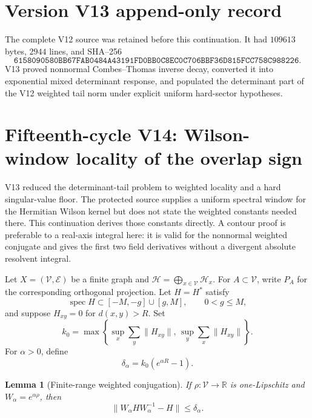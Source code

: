\documentclass[11pt]{article}
\newtheorem{lemma}[theorem]{Lemma}
\theoremstyle{remark}
\begin{document}
\section*{Version V13 append-only record}
The complete V12 source was retained before this continuation.  It
had \(109613\) bytes, \(2944\) lines, and SHA--256
\[
 \texttt{6158090580BB67FAB0484A43191FD0BB0C8EC0C706BBF36D815FCC758C988226}.
\]
V13 proved nonnormal Combes--Thomas inverse decay, converted it
into exponential mixed determinant response, and populated the
determinant part of the V12 weighted tail norm under explicit
uniform hard-sector hypotheses.

\section{Fifteenth-cycle V14: Wilson-window locality of the overlap sign}
\label{sec:v15v14}

V13 reduced the determinant-tail problem to weighted locality and a
hard singular-value floor.  The protected source supplies a uniform
spectral window for the Hermitian Wilson kernel but does not state the
weighted constants needed there.  This continuation derives those
constants directly.  A contour proof is preferable to a real-axis
integral here: it is valid for the nonnormal weighted conjugate and
gives the first two field derivatives without a divergent absolute
resolvent integral.

Let \(X=(\mathcal V,\mathcal E)\) be a finite graph and
\(\mathcal H=\bigoplus_{x\in\mathcal V}\mathcal H_x\).  For
\(A\subset\mathcal V\), write \(P_A\) for the corresponding
orthogonal projection.  Let \(H=H^*\) satisfy
\[
 \operatorname{spec}H\subset[-M,-g]\cup[g,M],
 \qquad 0<g\le M,                                           \tag{14.1}
\]
and suppose \(H_{xy}=0\) for \(d(x,y)>R\).  Set
\[
 k_0=\max\left\{
 \sup_x\sum_y\|H_{xy}\|,\,
 \sup_y\sum_x\|H_{xy}\|
 \right\}.                                                   \tag{14.2}
\]
For \(\alpha>0\), define
\[
 \delta_\alpha=k_0(e^{\alpha R}-1).                          \tag{14.3}
\]

\begin{lemma}[Finite-range weighted conjugation]
\label{lem:v15v14-conjugation}
If \(\rho:\mathcal V\to\mathbb R\) is one-Lipschitz and
\(W_\alpha=e^{\alpha\rho}\), then
\[
 \|W_\alpha H W_\alpha^{-1}-H\|
 \le\delta_\alpha.                                          \tag{14.4}
\]
\end{lemma}
\end{document}
